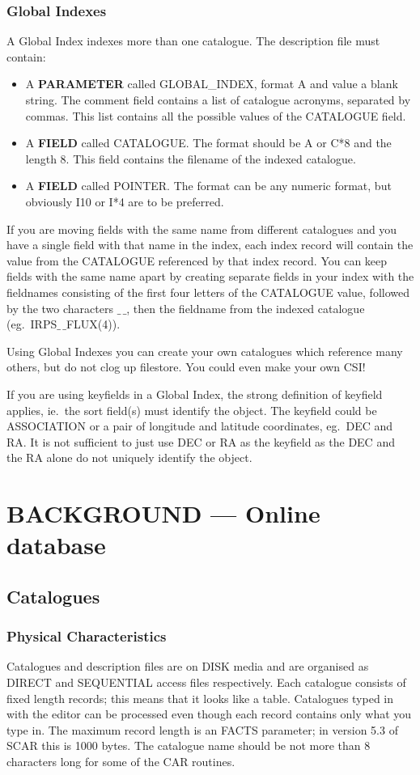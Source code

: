 \subsubsection {Global Indexes}
A Global Index indexes more than one catalogue.
The description file must contain:
\begin{itemize}
\item A {\bf PARAMETER} called GLOBAL\_INDEX, format A and value a blank string.
The comment field contains a list of catalogue acronyms, separated by commas.
This list contains all the possible values of the CATALOGUE field.
\item A {\bf FIELD} called CATALOGUE.
The format should be A or C*8 and the length 8.
This field contains the filename of the indexed catalogue.
\item A {\bf FIELD} called POINTER.
The format can be any numeric format, but obviously I10 or I*4 are to be
preferred.
\end{itemize}
If you are moving fields with the same name from different catalogues and you
have a single field with that name in the index, each index record will contain
the value from the CATALOGUE referenced by that index record.
You can keep fields with the same name apart by creating separate fields in your
index with the fieldnames consisting of the first four letters of the
CATALOGUE value, followed by the two characters $\_\,\_$, then the fieldname
from the indexed catalogue (eg.\ IRPS$\_\,\_$FLUX(4)).

Using Global Indexes you can create your own catalogues which reference many
others, but do not clog up filestore.
You could even make your own CSI!

If you are using keyfields in a Global Index, the strong definition of keyfield
applies, ie.\ the sort field(s) must identify the object.
The keyfield could be ASSOCIATION or a pair of longitude and latitude
coordinates, eg.\ DEC and RA.
It is not sufficient to just use DEC or RA as the keyfield as the DEC and the
RA alone do not uniquely identify the object.


\section {BACKGROUND --- Online database}

\subsection {Catalogues}
\subsubsection {Physical Characteristics}
Catalogues and description files are on DISK media and are organised as DIRECT
and SEQUENTIAL access files respectively.
Each catalogue consists of fixed length records; this means that it
looks like a table.
Catalogues typed in with the editor can be processed even though each record
contains only what you type in.
The maximum record length is an FACTS parameter; in version 5.3 of SCAR this is
1000 bytes.
The catalogue name should be not more than 8 characters long for
some of the CAR routines.


